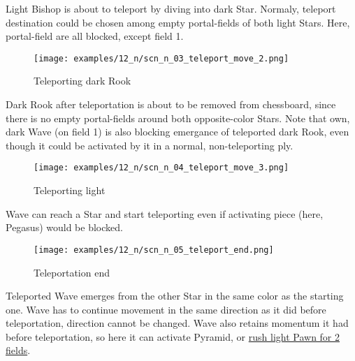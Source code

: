 Light Bishop is about to teleport by diving into dark Star. Normaly, teleport
destination could be chosen among empty portal-fields of both light Stars.
Here, portal-field are all blocked, except field 1.

\clearpage %

\noindent
\begin{figure}[!h]
\texttt{[image: examples/12\_n/scn\_n\_03\_teleport\_move\_2.png]}
\caption{Teleporting dark Rook}
\label{fig:scn_n_03_teleport_move_2}
\end{figure}

Dark Rook after teleportation is about to be removed from chessboard, since there
is no empty portal-fields around both opposite-color Stars. Note that own, dark
Wave (on field 1) is also blocking emergance of teleported dark Rook, even though
it could be activated by it in a normal, non-teleporting ply.

\clearpage %

\noindent
\begin{figure}[!h]
\texttt{[image: examples/12\_n/scn\_n\_04\_teleport\_move\_3.png]}
\caption{Teleporting light}
\label{fig:scn_n_04_teleport_move_3}
\end{figure}

Wave can reach a Star and start teleporting even if activating piece (here,
Pegasus) would be blocked.

\clearpage %

\noindent
\begin{figure}[!h]
\texttt{[image: examples/12\_n/scn\_n\_05\_teleport\_end.png]}
\caption{Teleportation end}
\label{fig:scn_n_05_teleport_end}
\end{figure}

Teleported Wave emerges from the other Star in the same color as the starting one.
Wave has to continue movement in the same direction as it did before teleportation,
direction cannot be changed. Wave also retains momentum it had before teleportation,
so here it can activate Pyramid, or
\hyperref[fig:scn_mv_18_activating_rush_pawn_init]{rush light Pawn for 2 fields}.

